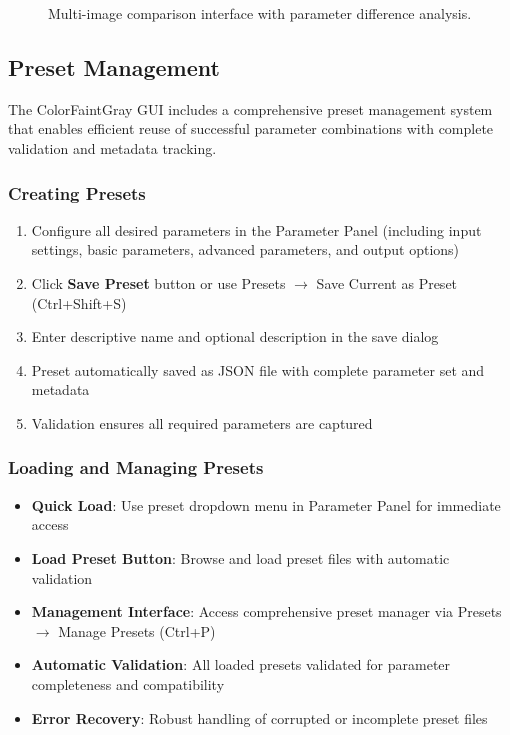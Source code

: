 \documentclass[11pt,a4paper]{article}
\begin{document}
\begin{figure}[H]
\centering
\caption{Multi-image comparison interface with parameter difference
analysis.}
\label{fig:comparison}
\end{figure}

\subsection{Preset Management}

The ColorFaintGray GUI includes a comprehensive preset management system
that enables efficient reuse of successful parameter combinations with
complete validation and metadata tracking.

\subsubsection{Creating Presets}

\begin{enumerate}
\item Configure all desired parameters in the Parameter Panel (including
input settings, basic parameters, advanced parameters, and output options)
\item Click \textbf{Save Preset} button or use Presets $\rightarrow$ Save
Current as Preset (Ctrl+Shift+S)
\item Enter descriptive name and optional description in the save dialog
\item Preset automatically saved as JSON file with complete parameter set
and metadata
\item Validation ensures all required parameters are captured
\end{enumerate}

\subsubsection{Loading and Managing Presets}

\begin{itemize}[leftmargin=*]
\item \textbf{Quick Load}: Use preset dropdown menu in Parameter Panel for
immediate access
\item \textbf{Load Preset Button}: Browse and load preset files with
automatic validation
\item \textbf{Management Interface}: Access comprehensive preset manager
via Presets $\rightarrow$ Manage Presets (Ctrl+P)
\item \textbf{Automatic Validation}: All loaded presets validated for
parameter completeness and compatibility
\item \textbf{Error Recovery}: Robust handling of corrupted or incomplete
preset files
\end{itemize}
\end{document}
